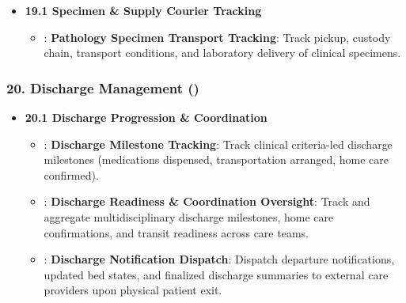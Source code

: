 \begin{itemize}

\item 
\textbf{19.1 Specimen \& Supply Courier Tracking}


\begin{itemize}

\item 
\texttt{}: \textbf{Pathology Specimen Transport Tracking}: Track pickup, custody chain, transport conditions, and laboratory delivery of clinical specimens.



\end{itemize}


\end{itemize}
\label{rad:enabling:552}
\subsubsection*{20. Discharge Management (\texttt{})}
\label{rad:enabling:553}

\begin{itemize}

\item 
\textbf{20.1 Discharge Progression \& Coordination}


\begin{itemize}

\item 
\texttt{}: \textbf{Discharge Milestone Tracking}: Track clinical criteria-led discharge milestones (medications dispensed, transportation arranged, home care confirmed).



\item 
\texttt{}: \textbf{Discharge Readiness \& Coordination Oversight}: Track and aggregate multidisciplinary discharge milestones, home care confirmations, and transit readiness across care teams.



\item 
\texttt{}: \textbf{Discharge Notification Dispatch}: Dispatch departure notifications, updated bed states, and finalized discharge summaries to external care providers upon physical patient exit.



\end{itemize}


\end{itemize}
\label{rad:enabling:558}

